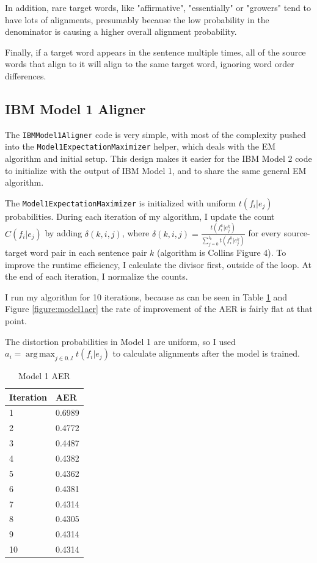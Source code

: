 \documentclass[11pt]{article}
\DeclareMathOperator*{\argmax}{arg\,max}
\begin{document}
In addition, rare target words, like
"affirmative", "essentially" or "growers" tend to have lots of alignments, presumably
because the low probability in the denominator is causing a higher overall
alignment probability.

Finally, if a target word appears in the sentence multiple times,
all of the source words that align to it will align to the same target word, ignoring
word order differences.

\subsection{IBM Model 1 Aligner}

The \texttt{IBMModel1Aligner} code is very simple, with most of the complexity pushed into
the \texttt{Model1ExpectationMaximizer} helper, which deals with the EM algorithm and
initial setup.  This design makes it easier for the IBM Model 2 code to initialize with the output
of IBM Model 1, and to share the same general EM algorithm.  

The \texttt{Model1ExpectationMaximizer} is initialized with uniform $ t(f_i|e_j) $ 
probabilities.  During each iteration of my algorithm, I update the count 
$ C(f_i|e_j) $
by adding $ \delta(k, i, j) $, where 
$ \delta(k, i, j) = \frac{t(f_i^k|e_j^k)}{\sum_{j=0}^{l_k}t(f_i^k|e_j^k)} $ 
for every source-target word pair in each sentence pair $ k $ (algorithm is Collins Figure 4).
To improve the runtime efficiency, I calculate the divisor first, outside of the loop.
At the end of each iteration, I normalize the counts.

I run my algorithm for 10 iterations, because as can be seen in Table \ref{table:model1aer}
and Figure \ref{figure:model1aer} the rate of improvement of the AER is fairly flat at that
point.

The distortion probabilities in Model 1 are uniform, so I used
$ a_i = \argmax_{j\in{0..l}} t(f_i|e_j) $ to calculate alignments after the model is
trained. 

\begin{table}
  \begin{center}
    \begin{tabular}{ l l }
      \hline
      Iteration & AER \\
      \hline
        1  & 0.6989 \\
        2  & 0.4772 \\
        3  & 0.4487 \\
        4  & 0.4382 \\
        5  & 0.4362 \\
        6  & 0.4381 \\
        7  & 0.4314 \\
        8  & 0.4305 \\
        9  & 0.4314 \\
        10 & 0.4314 \\
      \hline
    \end{tabular}
  \end{center}
  \caption{Model 1 AER}
  \label{table:model1aer}
\end{table}
\end{document}
